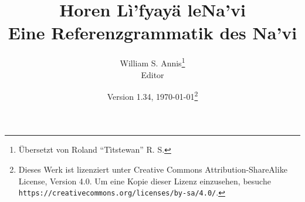 \documentclass[12pt,oneside]{book}
\begin{document}
\frenchspacing

\title{Horen Lì'fyayä leNa'vi\\Eine Referenzgrammatik des Na'vi}
\author{William S. Annis\footnote{Übersetzt von Roland ``Tìtstewan'' R. S.}\\Editor}
\date{Version 1.34, \today\footnote{Dieses Werk ist lizenziert unter Creative Commons Attribution-ShareAlike License, Version 4.0. Um eine Kopie dieser Lizenz einzusehen, besuche \texttt{https://creativecommons.org/licenses/by-sa/4.0/}.}}
\maketitle

\setcounter{tocdepth}{2}
\begin{multicols}{2}
\tableofcontents
\end{multicols}










\appendix
{\small \printindex}
\end{document}
